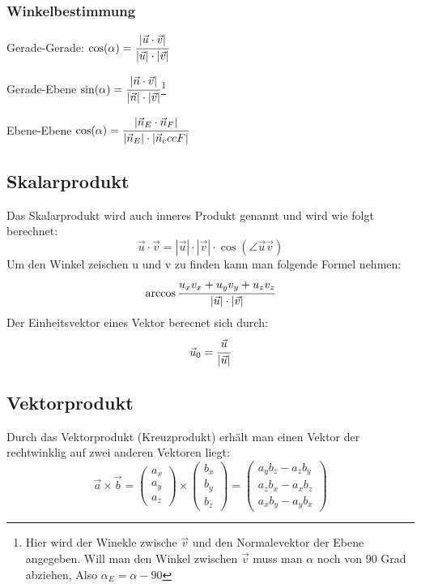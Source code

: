 \documentclass[a4paper,10pt]{scrartcl}
\begin{document}
            \subsubsection{Winkelbestimmung}
            \begin{description}
                \item Gerade-Gerade: $\cos(\alpha) = \cfrac{|\vec{u} \cdot \vec{v}|}{|\vec{u}|\cdot|\vec{v}|}$
                \item Gerade-Ebene  $\sin(\alpha) = \cfrac{|\vec{n} \cdot \vec{v}|}{|\vec{n}|\cdot|\vec{v}|}$\footnote{Hier wird der Winekle zwische $\vec{v}$ und den Normalevektor der Ebene angegeben. Will man den Winkel zwischen $\vec{v}$ muss man $\alpha$ noch von 90 Grad abziehen, Also $\alpha_E = \alpha - 90$}
                \item Ebene-Ebene $\cos(\alpha) = \cfrac{|\vec{n}_E \cdot \vec{n}_F|}{|\vec{n}_E|\cdot|\vec{n}_cccF|}$
            \end{description} 

        \subsection{Skalarprodukt}
            Das Skalarprodukt wird auch inneres Produkt genannt und wird wie folgt berechnet: 
            \[\vec{u} \cdot \vec{v} = |\vec{u}| \cdot |\vec{v}| \cdot \cos(\angle \vec{u} \vec{v})\]
            Um den Winkel zeischen u und v zu finden kann man folgende Formel nehmen: \[\arccos \cfrac{u_xv_x + u_yv_y + u_zv_z}{|\vec{u}|\cdot|\vec{v}|}\]
            Der Einheitsvektor eines Vektor berecnet sich durch:  \[\vec{u}_0 = \cfrac{\vec{u}}{|\vec{u}|}\]
        \subsection{Vektorprodukt}
            Durch das Vektorprodukt (Kreuzprodukt) erhält man einen Vektor der rechtwinklig auf zwei anderen Vektoren liegt:
            \[
                \vec{a} \times \vec{b} 
                =
                \begin{pmatrix}
                    a_x\\
                    a_y\\
                    a_z
                \end{pmatrix} \times
                \begin{pmatrix}
                    b_x\\
                    b_y\\
                    b_z
                \end{pmatrix}
                = 
                \begin{pmatrix}
                    a_yb_z - a_zb_y\\
                    a_zb_x - a_xb_z\\
                    a_xb_y - a_yb_x
                \end{pmatrix} 
            \]
\end{document}
